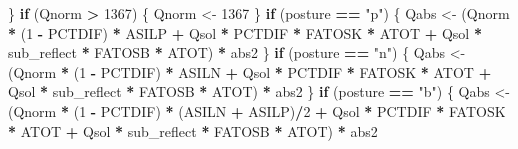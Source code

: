 \documentclass[]{article}
\newenvironment{Shaded}{\begin{snugshade}}{\end{snugshade}}
\newcommand{\DecValTok}[1]{\textcolor[rgb]{0.00,0.00,0.81}{#1}}
\newcommand{\StringTok}[1]{\textcolor[rgb]{0.31,0.60,0.02}{#1}}
\newcommand{\ControlFlowTok}[1]{\textcolor[rgb]{0.13,0.29,0.53}{\textbf{#1}}}
\newcommand{\OperatorTok}[1]{\textcolor[rgb]{0.81,0.36,0.00}{\textbf{#1}}}
\newcommand{\NormalTok}[1]{#1}
\begin{document}
\begin{Shaded}
\begin{Highlighting}[]
\NormalTok{    \}}
    \ControlFlowTok{if}\NormalTok{ (Qnorm }\OperatorTok{>}\StringTok{ }\DecValTok{1367}\NormalTok{) \{}
\NormalTok{        Qnorm <-}\StringTok{ }\DecValTok{1367}
\NormalTok{    \}}
    \ControlFlowTok{if}\NormalTok{ (posture }\OperatorTok{==}\StringTok{ "p"}\NormalTok{) \{}
\NormalTok{        Qabs <-}\StringTok{ }\NormalTok{(Qnorm }\OperatorTok{*}\StringTok{ }\NormalTok{(}\DecValTok{1} \OperatorTok{-}\StringTok{ }\NormalTok{PCTDIF) }\OperatorTok{*}\StringTok{ }\NormalTok{ASILP }\OperatorTok{+}\StringTok{ }\NormalTok{Qsol }\OperatorTok{*}\StringTok{ }\NormalTok{PCTDIF }\OperatorTok{*}\StringTok{ }
\StringTok{            }\NormalTok{FATOSK }\OperatorTok{*}\StringTok{ }\NormalTok{ATOT }\OperatorTok{+}\StringTok{ }\NormalTok{Qsol }\OperatorTok{*}\StringTok{ }\NormalTok{sub_reflect }\OperatorTok{*}\StringTok{ }\NormalTok{FATOSB }\OperatorTok{*}\StringTok{ }\NormalTok{ATOT) }\OperatorTok{*}\StringTok{ }
\StringTok{            }\NormalTok{abs2}
\NormalTok{    \}}
    \ControlFlowTok{if}\NormalTok{ (posture }\OperatorTok{==}\StringTok{ "n"}\NormalTok{) \{}
\NormalTok{        Qabs <-}\StringTok{ }\NormalTok{(Qnorm }\OperatorTok{*}\StringTok{ }\NormalTok{(}\DecValTok{1} \OperatorTok{-}\StringTok{ }\NormalTok{PCTDIF) }\OperatorTok{*}\StringTok{ }\NormalTok{ASILN }\OperatorTok{+}\StringTok{ }\NormalTok{Qsol }\OperatorTok{*}\StringTok{ }\NormalTok{PCTDIF }\OperatorTok{*}\StringTok{ }
\StringTok{            }\NormalTok{FATOSK }\OperatorTok{*}\StringTok{ }\NormalTok{ATOT }\OperatorTok{+}\StringTok{ }\NormalTok{Qsol }\OperatorTok{*}\StringTok{ }\NormalTok{sub_reflect }\OperatorTok{*}\StringTok{ }\NormalTok{FATOSB }\OperatorTok{*}\StringTok{ }\NormalTok{ATOT) }\OperatorTok{*}\StringTok{ }
\StringTok{            }\NormalTok{abs2}
\NormalTok{    \}}
    \ControlFlowTok{if}\NormalTok{ (posture }\OperatorTok{==}\StringTok{ "b"}\NormalTok{) \{}
\NormalTok{        Qabs <-}\StringTok{ }\NormalTok{(Qnorm }\OperatorTok{*}\StringTok{ }\NormalTok{(}\DecValTok{1} \OperatorTok{-}\StringTok{ }\NormalTok{PCTDIF) }\OperatorTok{*}\StringTok{ }\NormalTok{(ASILN }\OperatorTok{+}\StringTok{ }\NormalTok{ASILP)}\OperatorTok{/}\DecValTok{2} \OperatorTok{+}\StringTok{ }\NormalTok{Qsol }\OperatorTok{*}\StringTok{ }
\StringTok{            }\NormalTok{PCTDIF }\OperatorTok{*}\StringTok{ }\NormalTok{FATOSK }\OperatorTok{*}\StringTok{ }\NormalTok{ATOT }\OperatorTok{+}\StringTok{ }\NormalTok{Qsol }\OperatorTok{*}\StringTok{ }\NormalTok{sub_reflect }\OperatorTok{*}\StringTok{ }\NormalTok{FATOSB }\OperatorTok{*}\StringTok{ }
\StringTok{            }\NormalTok{ATOT) }\OperatorTok{*}\StringTok{ }\NormalTok{abs2}

\end{Highlighting}
\end{Shaded}
\end{document}
